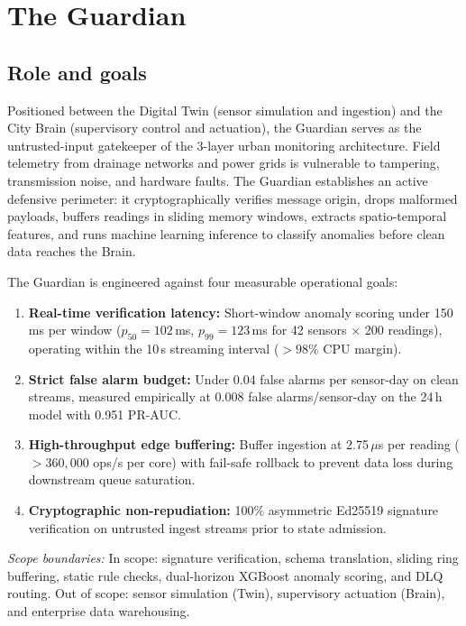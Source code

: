 \documentclass[11pt,a4paper]{article}
\begin{document}
\setcounter{section}{2} %

\section{The Guardian}

\subsection{Role and goals}
Positioned between the Digital Twin (sensor simulation and ingestion) and the City Brain (supervisory control and actuation), the Guardian serves as the untrusted-input gatekeeper of the 3-layer urban monitoring architecture. Field telemetry from drainage networks and power grids is vulnerable to tampering, transmission noise, and hardware faults. The Guardian establishes an active defensive perimeter: it cryptographically verifies message origin, drops malformed payloads, buffers readings in sliding memory windows, extracts spatio-temporal features, and runs machine learning inference to classify anomalies before clean data reaches the Brain.

The Guardian is engineered against four measurable operational goals:
\begin{enumerate}[leftmargin=*,itemsep=1pt,topsep=2pt]
  \item \textbf{Real-time verification latency:} Short-window anomaly scoring under 150\,ms per window ($p_{50} = 102$\,ms, $p_{99} = 123$\,ms for 42 sensors $\times$ 200 readings), operating within the 10\,s streaming interval ($>98\%$ CPU margin).
  \item \textbf{Strict false alarm budget:} Under 0.04 false alarms per sensor-day on clean streams, measured empirically at 0.008 false alarms/sensor-day on the 24\,h model with 0.951 PR-AUC.
  \item \textbf{High-throughput edge buffering:} Buffer ingestion at 2.75\,$\mu$s per reading ($>360,000$ ops/s per core) with fail-safe rollback to prevent data loss during downstream queue saturation.
  \item \textbf{Cryptographic non-repudiation:} 100\% asymmetric Ed25519 signature verification on untrusted ingest streams prior to state admission.
\end{enumerate}

\noindent\textit{Scope boundaries:} In scope: signature verification, schema translation, sliding ring buffering, static rule checks, dual-horizon XGBoost anomaly scoring, and DLQ routing. Out of scope: sensor simulation (Twin), supervisory actuation (Brain), and enterprise data warehousing.
\end{document}
